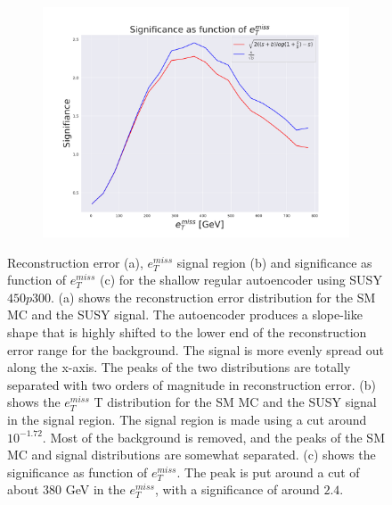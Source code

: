 \begin{figure}[!htb]
    \hfill  
    \begin{subfigure}{.49\textwidth}
        \includegraphics[width=\textwidth]{Figures/AE_testing/small/2lep/significance_etmiss_450p0p0300_-1.7167506533614734.pdf}
        \caption{}
        \label{fig:AE_2lep_small_signi_450}
    \end{subfigure}
    \hfill      
    \caption[2lep shallow network | $450p300$ | AE]{Reconstruction error (a), $e_T^{miss}$ signal region (b) and significance as function of 
    $e_T^{miss}$ (c) for the shallow regular autoencoder using SUSY $450p300$. 
    (a) shows the reconstruction error distribution for the SM MC and the SUSY signal. 
    The autoencoder produces a slope-like shape that is highly shifted to the lower end of the reconstruction error range
for the background. The signal is more evenly spread out along the x-axis. The peaks of the two distributions are totally separated
with two orders of magnitude in reconstruction error. (b) shows the $e_T^{miss}$
T distribution for the SM MC and the SUSY signal in the signal region. The signal region is made using a cut around
$10^{-1.72}$. Most of the background is removed, and the peaks of the SM MC and signal distributions are
somewhat separated. (c) shows the significance as function of $e_T^{miss}$. The peak is put 
around a cut of about 380 GeV in the $e_T^{miss}$, with a significance of around $2.4$.}
    \label{fig:AE_2lep_small_rec_sig_signi_450}
\end{figure}


